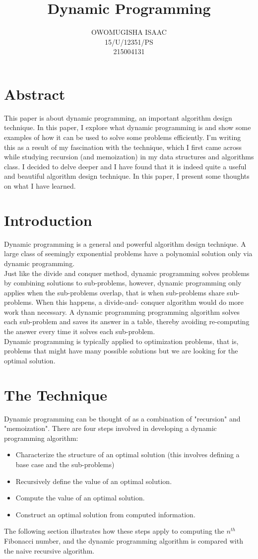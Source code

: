 \documentclass[8pt]{article}
\title{Dynamic Programming}
\author{OWOMUGISHA ISAAC\\
15/U/12351/PS\\
215004131
}
\date{}
\begin{document}
\maketitle

\section*{Abstract}

This paper is about dynamic programming, an important algorithm design technique. In this paper, I explore what dynamic programming is and
show some examples of how it can be used to solve some problems efficiently. I'm writing this as a result of my fascination with the technique,
which I first came across while studying recursion (and memoization) in my data structures and algorithms class. I decided to delve deeper and I have 
found that it is indeed quite a useful and beautiful algorithm design technique. In this paper, I present some thoughts on what I have learned.

\section{Introduction}
Dynamic programming is a general and powerful algorithm design technique. A large class of seemingly exponential problems have a 
polynomial solution only  via dynamic programming.\\
Just like the divide and conquer method, dynamic programming solves problems by combining solutions to sub-problems, however, dynamic
programming only applies when the sub-problems overlap, that is when sub-problems share sub-problems. When this happens, a divide-and-
conquer algorithm would do more work than necessary. A dynamic programming programming algorithm solves each sub-problem and saves its 
answer in a table, thereby avoiding re-computing the answer every time it solves each sub-problem.\\
Dynamic programming is typically applied to optimization problems, that is, problems that might have many possible solutions but we are looking for the optimal solution.

\section{The Technique}
Dynamic programming can be thought of as a combination of "recursion" and "memoization". There are four steps involved in developing a dynamic programming algorithm:
\begin{itemize}
\item Characterize the structure of an optimal solution (this involves defining a base case and the sub-problems)
\item Recursively define the value of an optimal solution.
\item Compute the value of an optimal solution.
\item Construct an optimal solution from computed information.
\end{itemize}
The following section illustrates how these steps apply to computing the $n ^ {th}$ Fibonacci number, and the dynamic programming algorithm is compared with the naive recursive algorithm.
\\\\
\end{document}
